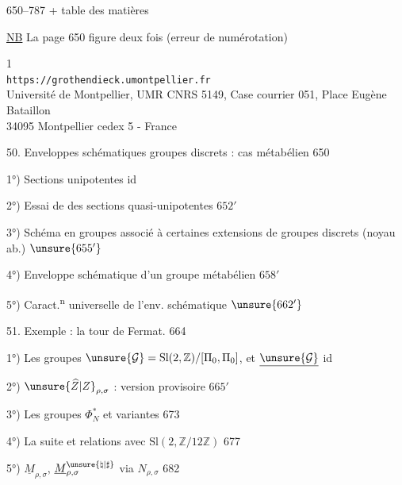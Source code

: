 
 650--787 + table des matières

\uline{NB} La page 650 figure deux fois (erreur de numérotation)


\begin{center}
\small
1\\
\texttt{https://grothendieck.umontpellier.fr}\\
Université de Montpellier, UMR CNRS 5149, Case courrier 051, Place Eugène Bataillon\\
34095 Montpellier cedex 5 - France
\end{center}

50. Enveloppes schématiques  groupes discrets : cas métabélien \hfill 650

1°) Sections unipotentes \hfill id

2°) Essai de  des sections quasi-unipotentes \hfill $652'$

3°) Schéma en groupes associé à certaines extensions de groupes discrets (noyau ab.) \hfill $\unsure{655'}$

4°) Enveloppe schématique d'un groupe métabélien \hfill $658'$

5°) Caract.\textsuperscript{n} universelle de l'env. schématique \hfill $\unsure{662'}$

51. Exemple : la tour de Fermat. \hfill 664

1°) Les groupes $\unsure{\mathcal G}=\mathrm{Sl}(2,\mathbb Z)/[\Pi_0,\Pi_0]$, et $\underline{\unsure{\mathcal G}}$ \hfill id

2°) $\unsure{\widehat Z|Z}_{\rho,\sigma}$ : version provisoire \hfill $665'$

3°) Les groupes $\Phi_N^*$ et variantes \hfill 673

4°) La suite
et relations avec $\mathrm{Sl}(2,\mathbb Z/12\mathbb Z)$ \hfill 677

5°) $\underline M_{\rho,\sigma}$, $\underline M^{\unsure{\natural|\sharp}}_{\rho,\sigma}$ via $N_{\rho,\sigma}$ \hfill 682

